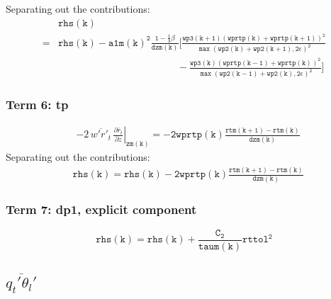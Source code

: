 \documentclass[11pt,fleqn]{article}
\newcommand{\ptlder}[2]{\frac{\partial #1}{\partial #2}}
\begin{document}
%
Separating out the contributions:
%
\begin{equation}
\begin{split}
&\mathtt{rhs(k)} \\
=& \mathtt{
   rhs(k)
   - a1m(k)^{2}\frac{1 - \frac{1}{3}\beta}{dzm(k)}
     \bigg[ \frac{wp3(k+1) \left(wprtp(k)+wprtp(k+1)\right)^2}
                 {\max\left(wp2(k)+wp2(k+1),2\epsilon\right)^2} } \\
 & \mathtt{ \quad \quad \quad \quad \qquad \qquad \qquad \qquad
           -\frac{wp3(k) \left(wprtp(k-1)+wprtp(k)\right)^2}
                 {\max\left(wp2(k-1)+wp2(k),2\epsilon\right)^2}
     \bigg]
   }
\end{split}
\end{equation}

\subsubsection{Term 6:  tp}

\begin{equation}
\begin{split}
&\left. - 2 \, \overline{w'r'_t} \, \ptlder{\bar{r}_t}{z} \right|_{\mathtt{zm(k)}}
 = \mathtt{ - 2 wprtp(k) \frac{rtm(k+1)-rtm(k)}{dzm(k)} }
\end{split}
\end{equation}
%
Separating out the contributions:
%
\begin{equation}
\begin{split}
&\mathtt{rhs(k) = rhs(k) - 2 wprtp(k) \frac{rtm(k+1)-rtm(k)}{dzm(k)} }
\end{split}
\end{equation}

\subsubsection{Term 7:  dp1, explicit component}

\begin{equation}
\mathtt{ rhs(k) = rhs(k) + \frac{C_2}{taum(k)} rttol^{2} }
\end{equation}


\subsection{ $\overline{q_t'\theta_l'}$  }
\end{document}
